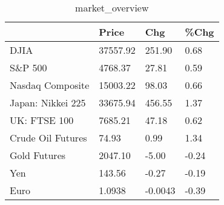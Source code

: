 \documentclass{article}%
\begin{document}
%


\begin{table}[htbp]%
\caption{market\_overview}%
\centering%
\begin{adjustbox}{width=1\textwidth}%
\begin{tabular}{llll}
\toprule
                  &    Price &     Chg &  \%Chg \\
\midrule
             DJIA & 37557.92 &  251.90 &  0.68 \\
          S\&P 500 &  4768.37 &   27.81 &  0.59 \\
 Nasdaq Composite & 15003.22 &   98.03 &  0.66 \\
Japan: Nikkei 225 & 33675.94 &  456.55 &  1.37 \\
     UK: FTSE 100 &  7685.21 &   47.18 &  0.62 \\
Crude Oil Futures &    74.93 &    0.99 &  1.34 \\
     Gold Futures &  2047.10 &   -5.00 & -0.24 \\
              Yen &   143.56 &   -0.27 & -0.19 \\
             Euro &   1.0938 & -0.0043 & -0.39 \\
\bottomrule
\end{tabular}
%
\end{adjustbox}%
\end{table}

%
\end{document}
